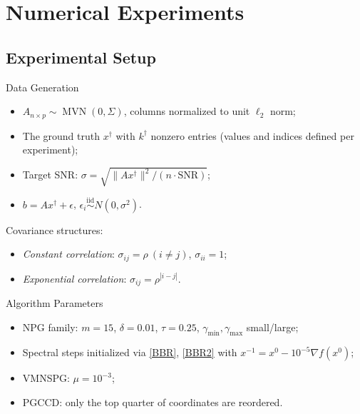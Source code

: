 \section{Numerical Experiments}

\subsection{Experimental Setup}
\begin{frame}{Data Generation}
\begin{itemize}
\item $A_{n\times p} \sim \operatorname{MVN}(0,\Sigma)$, columns normalized to unit $\ell_2$ norm;
\item The ground truth $x^\dagger$ with $k^\dagger$ nonzero entries (values and indices defined per experiment);
\item Target SNR: $\sigma = \sqrt{\|Ax^\dagger\|^2 / (n\cdot\text{SNR})}$;
\item $b = Ax^\dagger + \epsilon$, $\epsilon_i \stackrel{\text{iid}}{\sim} N(0,\sigma^2)$.
\end{itemize}
Covariance structures:
\begin{itemize}
\item \emph{Constant correlation}: $\sigma_{ij} = \rho\ (i\neq j)$, $\sigma_{ii}=1$;
\item \emph{Exponential correlation}: $\sigma_{ij} = \rho^{|i-j|}$.
\end{itemize}
\end{frame}

\begin{frame}{Algorithm Parameters}
\begin{itemize}
\item NPG family: $m=15$, $\delta=0.01$, $\tau=0.25$, $\gamma_{\min},\gamma_{\max}$ small/large;
\item Spectral steps initialized via \eqref{BBR}, \eqref{BBR2} with $x^{-1}=x^0 - 10^{-5}\nabla f(x^0)$;
\item VMNSPG: $\mu=10^{-3}$;
\item PGCCD: only the top quarter of coordinates are reordered.
\end{itemize}
\end{frame}

